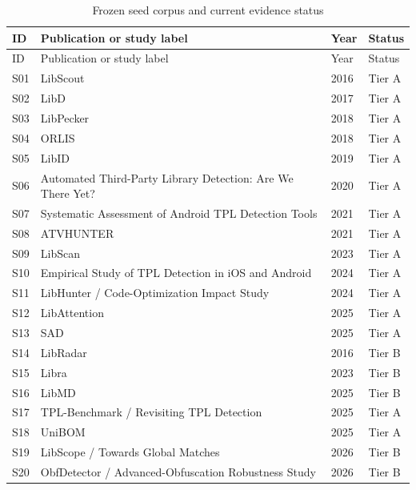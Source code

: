 \begin{longtable}{p{}p{}p{}p{}}
  \caption{Frozen seed corpus and current evidence status}
  \label{tab:review-seed-corpus}\\
  \toprule
  ID & Publication or study label & Year & Status \\
  \midrule
  \endfirsthead
  \toprule
  ID & Publication or study label & Year & Status \\
  \midrule
  \endhead
  S01 & LibScout \cite{backes2016libscout} & 2016 & Tier A \\
  S02 & LibD \cite{li2017libd} & 2017 & Tier A \\
  S03 & LibPecker \cite{zhang2018libpecker} & 2018 & Tier A \\
  S04 & ORLIS \cite{wang2018orlis} & 2018 & Tier A \\
  S05 & LibID \cite{zhang2019libid} & 2019 & Tier A \\
  S06 & Automated Third-Party Library Detection: Are We There Yet?
    \cite{zhan2020assessment} & 2020 & Tier A \\
  S07 & Systematic Assessment of Android TPL Detection Tools
    \cite{zhan2021systematic} & 2021 & Tier A \\
  S08 & ATVHUNTER \cite{zhan2021atvhunter} & 2021 & Tier A \\
  S09 & LibScan \cite{wu2023libscan} & 2023 & Tier A \\
  S10 & Empirical Study of TPL Detection in iOS and Android
    \cite{ramirez2024empirical} & 2024 & Tier A \\
  S11 & LibHunter / Code-Optimization Impact Study
    \cite{xie2024libhunter} & 2024 & Tier A \\
  S12 & LibAttention \cite{pan2025libattention} & 2025 & Tier A \\
  S13 & SAD \cite{zhou2025sad} & 2025 & Tier A \\
  S14 & LibRadar & 2016 & Tier B \\
  S15 & Libra & 2023 & Tier B \\
  S16 & LibMD & 2025 & Tier B \\
  S17 & TPL-Benchmark / Revisiting TPL Detection
    \cite{gu2025tplbenchmark} & 2025 & Tier A \\
  S18 & UniBOM \cite{safronov2025unibom} & 2025 & Tier A \\
  S19 & LibScope / Towards Global Matches & 2026 & Tier B \\
  S20 & ObfDetector / Advanced-Obfuscation Robustness Study & 2026 & Tier B \\
  \bottomrule
\end{longtable}

